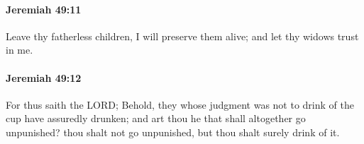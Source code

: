 		\paragraph{Jeremiah 49:11} %
			\label{JEREMIAH-49-11}

			Leave thy fatherless children, I will preserve them alive; and let thy widows trust in me.


		\paragraph{Jeremiah 49:12} %
			\label{JEREMIAH-49-12}

			For thus saith the LORD; Behold, they whose judgment was not to drink of the cup have assuredly drunken; and art thou he that shall altogether go unpunished? thou shalt not go unpunished, but thou shalt surely drink of it.


